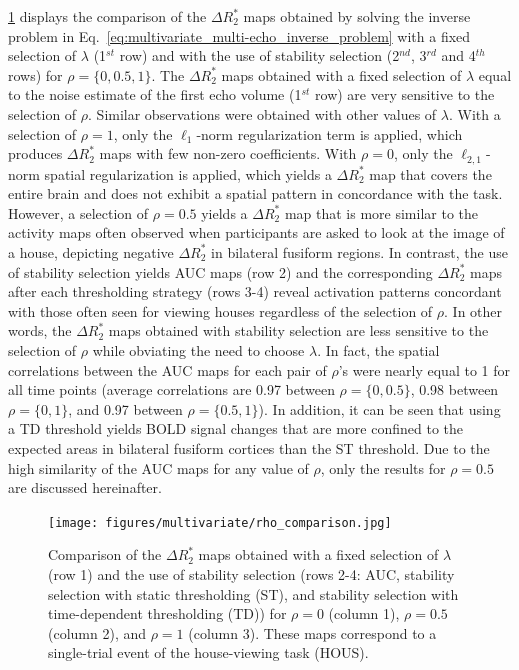 \cref{fig:rho_comparison} displays the comparison of the $\Delta R_2^*$
maps obtained by solving the inverse problem in
Eq.~\eqref{eq:multivariate_multi-echo_inverse_problem} with a fixed selection of
$\lambda$ (1$^{st}$ row) and with the use of stability selection (2$^{nd}$,
3$^{rd}$ and 4$^{th}$ rows) for $\rho = \{0, 0.5, 1\}$. The $\Delta R_2^*$ maps
obtained with a fixed selection of $\lambda$ equal to the noise estimate of the
first echo volume (1$^{st}$ row) are very sensitive to the selection of $\rho$.
Similar observations were obtained with other values of $\lambda$. With a
selection of $\rho = 1$, only the $\ell_1$-norm regularization term is applied,
which produces $\Delta R_2^*$ maps with few non-zero coefficients. With $\rho =
0$, only the $\ell_{2,1}$-norm spatial regularization is applied, which yields a
$\Delta R_2^*$ map that covers the entire brain and does not exhibit a spatial
pattern in concordance with the task. However, a selection of $\rho = 0.5$
yields a $\Delta R_2^*$ map that is more similar to the activity maps often
observed when participants are asked to look at the image of a house, depicting
negative $\Delta R_2^*$ in bilateral fusiform regions. In contrast, the use of
stability selection yields AUC maps (row 2) and the corresponding $\Delta R_2^*$
maps after each thresholding strategy (rows 3-4) reveal activation patterns
concordant with those often seen for viewing houses regardless of the selection
of $\rho$. In other words, the $\Delta R_2^*$ maps obtained with stability
selection are less sensitive to the selection of $\rho$ while obviating the need
to choose $\lambda$. In fact, the spatial correlations between the AUC maps for
each pair of $\rho$'s were nearly equal to 1 for all time points (average
correlations are 0.97 between $\rho=\{0,0.5\}$, 0.98 between $\rho=\{0,1\}$, and
0.97 between $\rho=\{0.5,1\}$). In addition, it can be seen that using a TD
threshold yields BOLD signal changes that are more confined to the expected
areas in bilateral fusiform cortices than the ST threshold. Due to the high
similarity of the AUC maps for any value of $\rho$, only the results for
$\rho=0.5$ are discussed hereinafter.

\begin{figure}[ht!]
    \centerline{\texttt{[image: figures/multivariate/rho\_comparison.jpg]}}
    \caption{Comparison of the $\Delta R_2^*$ maps obtained with a fixed
    selection of $\lambda$ (row 1) and the use of stability selection (rows 2-4:
    AUC, stability selection with static thresholding (ST), and stability
    selection with time-dependent thresholding (TD)) for $\rho = 0$ (column 1),
    $\rho = 0.5$ (column 2), and $\rho = 1$ (column 3). These maps correspond to
    a single-trial event of the house-viewing task (HOUS).}
\label{fig:rho_comparison}
\end{figure}


